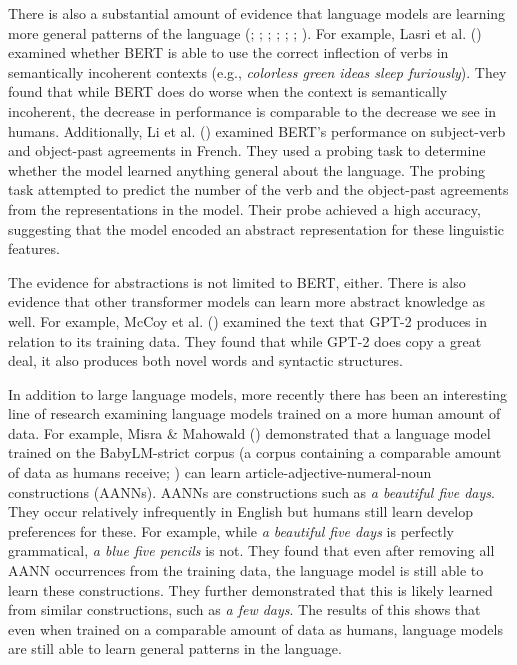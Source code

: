 \documentclass[
  12pt,
  letterpaper,
]{scrreport}
\begin{document}
There is also a substantial amount of evidence that language models are
learning more general patterns of the language
(;
;
;
;
;
; ). For example, Lasri et al.
() examined whether
BERT is able to use the correct inflection of verbs in semantically
incoherent contexts (e.g., \emph{colorless green ideas sleep
furiously}). They found that while BERT does do worse when the context
is semantically incoherent, the decrease in performance is comparable to
the decrease we see in humans. Additionally, Li et al.
() examined
BERT's performance on subject-verb and object-past agreements in French.
They used a probing task to determine whether the model learned anything
general about the language. The probing task attempted to predict the
number of the verb and the object-past agreements from the
representations in the model. Their probe achieved a high accuracy,
suggesting that the model encoded an abstract representation for these
linguistic features.

The evidence for abstractions is not limited to BERT, either. There is
also evidence that other transformer models can learn more abstract
knowledge as well. For example, McCoy et al.
() examined the text that
GPT-2 produces in relation to its training data. They found that while
GPT-2 does copy a great deal, it also produces both novel words and
syntactic structures.

In addition to large language models, more recently there has been an
interesting line of research examining language models trained on a more
human amount of data. For example, Misra \& Mahowald
() demonstrated that a
language model trained on the BabyLM-strict corpus (a corpus containing
a comparable amount of data as humans receive;
) can learn article-adjective-numeral-noun constructions (AANNs).
AANNs are constructions such as \emph{a beautiful five days}. They occur
relatively infrequently in English but humans still learn develop
preferences for these. For example, while \emph{a beautiful five days}
is perfectly grammatical, \emph{a blue five pencils} is not. They found
that even after removing all AANN occurrences from the training data,
the language model is still able to learn these constructions. They
further demonstrated that this is likely learned from similar
constructions, such as \emph{a few days}. The results of this shows that
even when trained on a comparable amount of data as humans, language
models are still able to learn general patterns in the language.
\end{document}
